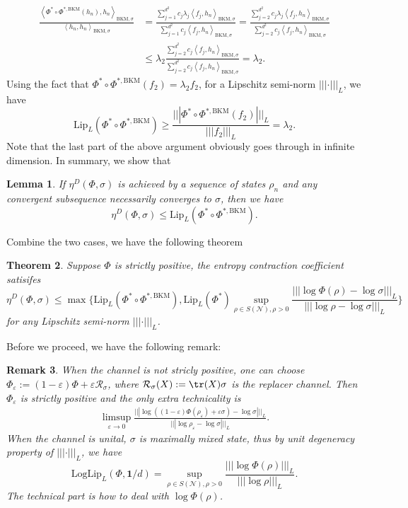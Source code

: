 \documentclass[11pt,reqno]{amsart}
\numberwithin{equation}{section}
\newtheorem{lemma}{Lemma}[section]
\newtheorem{theorem}[lemma]{Theorem}
\newtheorem{remark}[lemma]{Remark}
\newcommand{\mc}{\mathcal}
\newcommand{\Lip}{\mathrm{Lip}}
\newcommand{\BKM}[2]{\left\langle #1,#2\right\rangle_{\mathrm{BKM},\sigma}} %
\begin{document}
\begin{align*}
    \frac{\BKM{\Phi^* \circ \Phi^{*, \mathrm{BKM}}(h_n)}{h_n}}{\BKM{h_n}{h_n}} & = \frac{\sum_{j=1}^{d^2} c_j \lambda_j \BKM{f_j}{h_n}}{ \sum_{j=1}^{d^2} c_j \BKM{f_j}{h_n}} = \frac{\sum_{j=2}^{d^2} c_j \lambda_j \BKM{f_j}{h_n}}{\sum_{j=2}^{d^2} c_j \BKM{f_j}{h_n}} \\
    & \le \lambda_2 \frac{\sum_{j=2}^{d^2} c_j \BKM{f_j}{h_n}}{\sum_{j=2}^{d^2} c_j \BKM{f_j}{h_n}} = \lambda_2.
\end{align*}
Using the fact that $\Phi^* \circ \Phi^{*, \mathrm{BKM}}(f_2) = \lambda_2 f_2$, for a Lipschitz semi-norm $|||\cdot|||_L$, we have
\begin{equation}
    \Lip_L(\Phi^* \circ \Phi^{*, \mathrm{BKM}}) \ge \frac{|||\Phi^* \circ \Phi^{*, \mathrm{BKM}}(f_2)|||_L}{|||f_2|||_L} = \lambda_2.
\end{equation}
Note that the last part of the above argument obviously goes through in infinite dimension. In summary, we show that 
\begin{lemma}\label{lemma:converging sequence}
     If $\eta^D(\Phi,\sigma)$ is achieved by a sequence of states $\rho_n$ and any convergent subsequence necessarily converges to $\sigma$, then we have 
     \begin{equation}
         \eta^D(\Phi,\sigma) \le \Lip_L(\Phi^* \circ \Phi^{*, \mathrm{BKM}}). 
     \end{equation}
\end{lemma}
Combine the two cases, we have the following theorem 
\begin{theorem}\label{main: entropy contraction upper}
    Suppose $\Phi$ is strictly positive, the entropy contraction coefficient satisifes
    \begin{equation}
        \eta^D(\Phi,\sigma) \le \max\{\Lip_L(\Phi^* \circ \Phi^{*, \mathrm{BKM}}), \Lip_L(\Phi^*) \sup_{\rho \in S(\mc N), \rho>0}\frac{|||\log \Phi(\rho) - \log \sigma|||_L}{|||\log \rho - \log \sigma|||_L}\}
    \end{equation}
    for any Lipschitz semi-norm $|||\cdot|||_L$.
\end{theorem}
Before we proceed, we have the following remark:
\begin{remark}
When the channel is not stricly positive, one can choose $\Phi_\varepsilon:= (1-\varepsilon)\Phi + \varepsilon \mc R_\sigma$, where $\mc R_\sigma(X):= \tr(X) \sigma$ is the replacer channel. Then $\Phi_\varepsilon$ is strictly positive and the only extra technicality is 
    \begin{align*}
        \limsup_{\varepsilon \to 0}\frac{|||\log \left( (1-\varepsilon)\Phi(\rho_\varepsilon) + \varepsilon\sigma \right) - \log \sigma|||_L}{|||\log \rho_\varepsilon - \log \sigma|||_L}.
    \end{align*}
When the channel is unital, $\sigma$ is maximally mixed state, thus by unit degeneracy property of $|||\cdot|||_L$, we have  
    \begin{equation}
        \mathrm{Log}\Lip_L(\Phi,\textbf{1}/d) = \sup_{\rho \in S(\mc N), \rho>0}\frac{|||\log \Phi(\rho) |||_L}{|||\log \rho |||_L}.
    \end{equation}
The technical part is how to deal with $\log \Phi(\rho)$. 
\end{remark}
\end{document}
